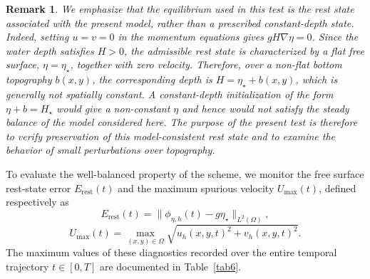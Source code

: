 \documentclass[pdflatex,sn-mathphys-num]{sn-jnl}%
\theoremstyle{thmstyleone}%
\theoremstyle{thmstyletwo}%
\newtheorem{remark}{Remark}%
\theoremstyle{thmstylethree}%
\begin{document}
\begin{remark}
We emphasize that the equilibrium used in this test is the rest state associated with the present model, rather than a prescribed constant-depth state. Indeed, setting $u=v=0$ in the momentum equations gives $gH\nabla\eta=0$.
Since the water depth satisfies $H>0$, the admissible rest state is characterized by a flat free surface, $\eta=\eta_\star$, together with zero velocity.
Therefore, over a non-flat bottom topography $b(x,y)$, the corresponding depth is $H=\eta_\star+b(x,y)$,
which is generally not spatially constant.
A constant-depth initialization of the form $\eta+b=H_\star$ would give a non-constant $\eta$ and hence would not satisfy the steady balance of the model considered here. The purpose of the present test is therefore to verify preservation of this model-consistent rest state and to examine the behavior of small perturbations over topography.
\end{remark}

To evaluate the well-balanced property of the scheme, we monitor the free surface rest-state error $E_{\mathrm{rest}}(t)$ and the maximum spurious velocity $U_{\max}(t)$, defined respectively as
\begin{equation}
\label{eq:lake_error}
E_{\mathrm{rest}}(t) = \|\phi_{\eta,h}(t)-g\eta_\star\|_{L^2(\Omega)},
\end{equation}
\begin{equation}
\label{eq:spurious_velocity}
U_{\max}(t)= \max_{(x,y)\in\Omega} \sqrt{u_h(x,y,t)^2+v_h(x,y,t)^2}.
\end{equation}
The maximum values of these diagnostics recorded over the entire temporal trajectory $t \in [0, T]$ are documented in Table~\ref{tab6}.
\end{document}

